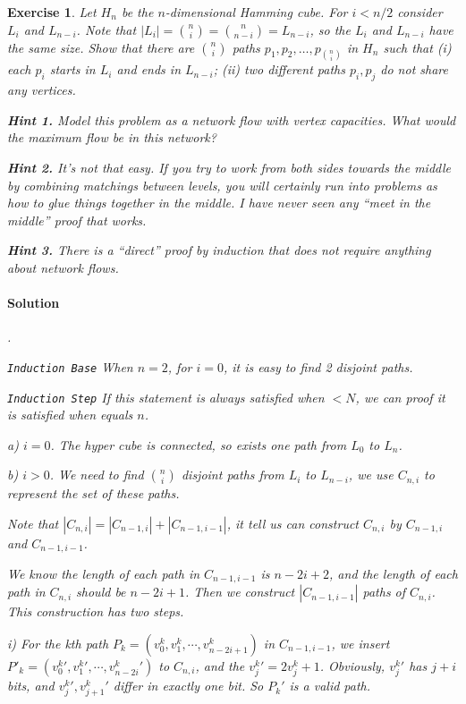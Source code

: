 \documentclass[12pt,a4]{article}
\newtheorem{exercise}[theorem]{Exercise}
\begin{document}
\begin{exercise} 
  Let $H_n$ be the $n$-dimensional Hamming cube. For $i < n/2$ consider
  $L_i$ and $L_{n-i}$. Note that 
  $|L_i| = {n \choose i} = { n \choose n-i}  = L_{n-i}$, so the 
  $L_i$ and $L_{n-i}$ have the same size.   Show that there are ${n \choose i}$ paths $p_1,p_2,\dots,p_{ {n \choose i}}$
  in $H_n$ such that
  (i) each $p_i$ starts in $L_i$ and ends in $L_{n-i}$;
  (ii) two different paths $p_i,p_j$ do not share any vertices.

  \textbf{Hint 1.} Model this problem as a network flow with vertex capacities. What would 
  the maximum flow be in this network?
  
  \textbf{Hint 2.} It's not {\em that} easy. If you try to work from both sides towards
  the middle by combining matchings between levels, 
  you will certainly run into problems as how to glue things together in the middle.
  I have never seen any ``meet in the middle'' proof that works.
  
  \textbf{Hint 3.} There is a ``direct'' proof by induction that does not require anything
  about network flows.

\paragraph{Solution} .

\texttt{Induction Base} When $n=2$, for $i=0$, it is easy to 
find 2 disjoint paths. 

\texttt{Induction Step} If this statement is always satisfied when $< N$, we can proof it is satisfied when equals $n$.

a) $i=0$. The hyper cube is connected, so exists one path from
$L_0$ to $L_n$.

b) $i > 0$. We need to find $\binom{n}{i}$ disjoint paths from
$L_i$ to $L_{n-i}$, we use $C_{n,i}$ to represent the set of these paths.

Note that $|C_{n,i}|=|C_{n-1,i}|+|C_{n-1,i-1}|$, it tell us can construct $C_{n,i}$ by $C_{n-1,i}$ and $C_{n-1,i-1}$. 

We know the length of each path in $C_{n-1,i-1}$ is $n-2i+2$, and the length of each path in 
$C_{n,i}$ should be $n-2i+1$. Then we construct $|C_{n-1,i-1}|$ paths of $C_{n,i}$. This construction has two steps.

i)  For the kth path $P_k = (v_0^k, v_1^k, \cdots, v_{n-2i+1}^k )$ in $C_{n-1,i-1}$, we insert $P'_k = (v_0^k', v_1^k', \cdots, v_{n-2i}^k')$ to
 $C_{n,i}$, and the $v_j^k' = 2v^k_j + 1$. Obviously, $v_{j}^k'$ has $j + i$ bits,
 and $v_{j}^k', v_{j+1}^k'$ differ in exactly one bit. So $P_k'$ is a valid path.
 

\end{exercise}
\end{document}
